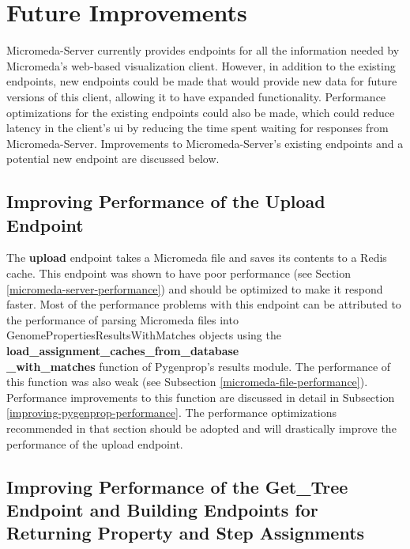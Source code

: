 \section{Future Improvements} \label{micromeda-server-improvements}

Micromeda-Server currently provides endpoints for all the information needed by Micromeda's web-based visualization client. However, in addition to the existing endpoints, new endpoints could be made that would provide new data for future versions of this client, allowing it to have expanded functionality. Performance optimizations for the existing endpoints could also be made, which could reduce latency in the client's \gls{ui} by reducing the time spent waiting for responses from Micromeda-Server. Improvements to Micromeda-Server's existing endpoints and a potential new endpoint are discussed below.

\subsection{Improving Performance of the Upload Endpoint}

The \textbf{upload} endpoint takes a Micromeda file and saves its contents to a Redis cache. This endpoint was shown to have poor performance (see Section \ref{micromeda-server-performance}) and should be optimized to make it respond faster. Most of the performance problems with this endpoint can be attributed to the performance of parsing Micromeda files into GenomePropertiesResultsWithMatches objects using the \textbf{load\_assignment\_caches\_from\_database \\ \_with\_matches} function of Pygenprop's results module. The performance of this function was also weak (see Subsection \ref{micromeda-file-performance}). Performance improvements to this function are discussed in detail in Subsection \ref{improving-pygenprop-performance}. The performance optimizations recommended in that section should be adopted and will drastically improve the performance of the upload endpoint.

\subsection{Improving Performance of the Get\_Tree Endpoint and Building Endpoints for Returning Property and Step Assignments} \label{assignment-endpoints}

